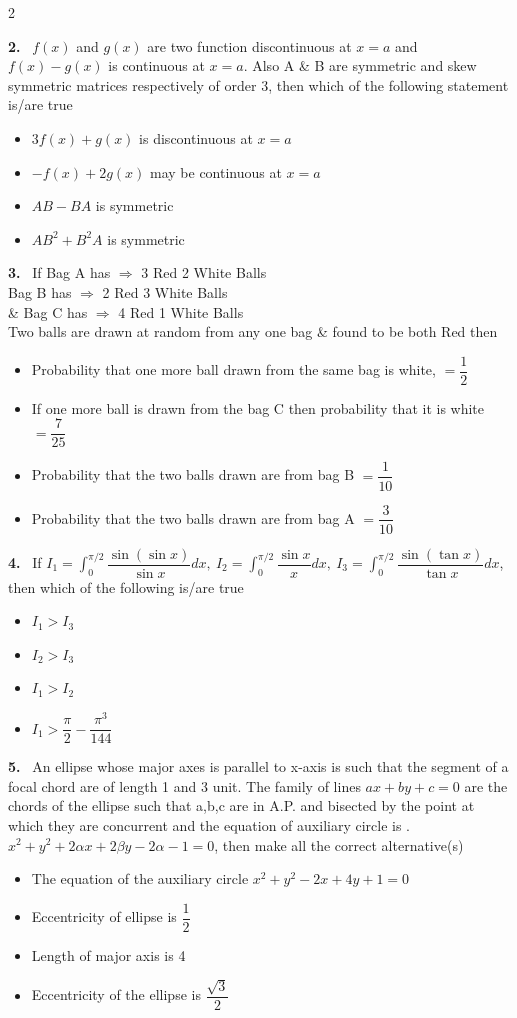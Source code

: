 \documentclass[10pt]{extarticle}
\newcommand{\qn}[1]{\par\smallskip\noindent\textbf{#1.}~}
\newenvironment{qoptions}{\begin{itemize}[leftmargin=1.8em,itemsep=1pt,topsep=2pt,label={}]}{\end{itemize}}
\newcommand{\opt}[2]{\item[(#1)] #2}
\begin{document}
\begin{multicols}{2}
\qn{2} $f(x)$ and $g(x)$ are two function discontinuous at $x=a$ and $f(x)-g(x)$ is continuous at $x=a$. Also A \& B are symmetric and skew symmetric matrices respectively of order 3, then which of the following statement is/are true
\begin{qoptions}
\opt{A}{$3f(x)+g(x)$ is discontinuous at $x=a$}
\opt{B}{$-f(x)+2g(x)$ may be continuous at $x=a$}
\opt{C}{$AB-BA$ is symmetric}
\opt{D}{$AB^2+B^2A$ is symmetric}
\end{qoptions}

\qn{3} If Bag A has $\Rightarrow$ 3 Red 2 White Balls\\
Bag B has $\Rightarrow$ 2 Red 3 White Balls\\
\& Bag C has $\Rightarrow$ 4 Red 1 White Balls\\
Two balls are drawn at random from any one bag \& found to be both Red then
\begin{qoptions}
\opt{A}{Probability that one more ball drawn from the same bag is white, $=\dfrac12$}
\opt{B}{If one more ball is drawn from the bag C then probability that it is white $=\dfrac7{25}$}
\opt{C}{Probability that the two balls drawn are from bag B $=\dfrac1{10}$}
\opt{D}{Probability that the two balls drawn are from bag A $=\dfrac3{10}$}
\end{qoptions}

\qn{4} If $I_1=\displaystyle\int_0^{\pi/2}\dfrac{\sin(\sin x)}{\sin x}dx,\ I_2=\int_0^{\pi/2}\dfrac{\sin x}{x}dx,\ I_3=\int_0^{\pi/2}\dfrac{\sin(\tan x)}{\tan x}dx$, then which of the following is/are true
\begin{qoptions}
\opt{A}{$I_1>I_3$}
\opt{B}{$I_2>I_3$}
\opt{C}{$I_1>I_2$}
\opt{D}{$I_1>\dfrac\pi2-\dfrac{\pi^3}{144}$}
\end{qoptions}

\qn{5} An ellipse whose major axes is parallel to x-axis is such that the segment of a focal chord are of length 1 and 3 unit. The family of lines $ax+by+c=0$ are the chords of the ellipse such that a,b,c are in A.P. and bisected by the point at which they are concurrent and the equation of auxiliary circle is . $x^2+y^2+2\alpha x+2\beta y-2\alpha-1=0$, then make all the correct alternative(s)
\begin{qoptions}
\opt{A}{The equation of the auxiliary circle $x^2+y^2-2x+4y+1=0$}
\opt{B}{Eccentricity of ellipse is $\dfrac12$}
\opt{C}{Length of major axis is 4}
\opt{D}{Eccentricity of the ellipse is $\dfrac{\sqrt3}2$}
\end{qoptions}


\end{multicols}
\end{document}

